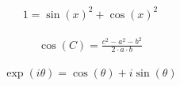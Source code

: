 \documentclass{article}
\begin{document}
\begin{align}
1 = \sin(x)^2 + \cos(x)^2
\end{align}

\begin{align}
\cos(C) = \frac{c^2 - a^2 - b^2}{2 \cdot a \cdot b}
\end{align}

\begin{align}
\exp(i\theta) = \cos(\theta) + i \sin(\theta)
\end{align}
\end{document}
